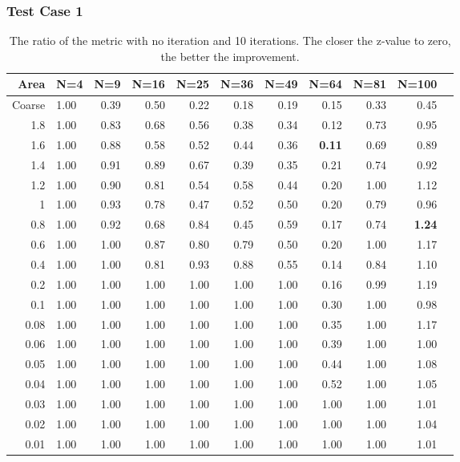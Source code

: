 \documentclass[compress]{beamer}
\begin{document}
\begin{frame}\frametitle{Test Case 1}
\begin{table}[H]
\tiny
\centering
\caption{The ratio  of the metric with no iteration and 10 iterations. The closer the z-value to zero, the better the improvement.} 
\begin{tabular}{rlrrrrrrrrr}
  \hline
 Area & N=4 & N=9 & N=16 & N=25 & N=36 & N=49 & N=64 & N=81 & N=100 \\ 
  \hline
 Coarse & 1.00 & 0.39 & 0.50 & 0.22 & 0.18 & 0.19 & 0.15 & 0.33 & 0.45 \\ 
   1.8 & 1.00 & 0.83 & 0.68 & 0.56 & 0.38 & 0.34 & 0.12 & 0.73 & 0.95 \\ 
   1.6 & 1.00 & 0.88 & 0.58 & 0.52 & 0.44 & 0.36 & \textbf{\cellcolor{blue!25}0.11} & 0.69 & 0.89 \\ 
  1.4 & 1.00 & 0.91 & 0.89 & 0.67 & 0.39 & 0.35 & 0.21 & 0.74 & 0.92 \\ 
   1.2 & 1.00 & 0.90 & 0.81 & 0.54 & 0.58 & 0.44 & 0.20 & 1.00 & 1.12 \\ 
   1 & 1.00 & 0.93 & 0.78 & 0.47 & 0.52 & 0.50 & 0.20 & 0.79 & 0.96 \\ 
0.8 & 1.00 & 0.92 & 0.68 & 0.84 & 0.45 & 0.59 & 0.17 & 0.74 & \textbf{\cellcolor{blue!25}1.24} \\ 
  0.6 & 1.00 & 1.00 & 0.87 & 0.80 & 0.79 & 0.50 & 0.20 & 1.00 & 1.17 \\ 
 0.4 & 1.00 & 1.00 & 0.81 & 0.93 & 0.88 & 0.55 & 0.14 & 0.84 & 1.10 \\ 
  0.2 & 1.00 & 1.00 & 1.00 & 1.00 & 1.00 & 1.00 & 0.16 & 0.99 & 1.19 \\ 
  0.1 & 1.00 & 1.00 & 1.00 & 1.00 & 1.00 & 1.00 & 0.30 & 1.00 & 0.98 \\ 
   0.08 & 1.00 & 1.00 & 1.00 & 1.00 & 1.00 & 1.00 & 0.35 & 1.00 & 1.17 \\ 
   0.06 & 1.00 & 1.00 & 1.00 & 1.00 & 1.00 & 1.00 & 0.39 & 1.00 & 1.00 \\ 
   0.05 & 1.00 & 1.00 & 1.00 & 1.00 & 1.00 & 1.00 & 0.44 & 1.00 & 1.08 \\ 
   0.04 & 1.00 & 1.00 & 1.00 & 1.00 & 1.00 & 1.00 & 0.52 & 1.00 & 1.05 \\ 
   0.03 & 1.00 & 1.00 & 1.00 & 1.00 & 1.00 & 1.00 & 1.00 & 1.00 & 1.01 \\ 
  0.02 & 1.00 & 1.00 & 1.00 & 1.00 & 1.00 & 1.00 & 1.00 & 1.00 & 1.04 \\ 
   0.01 & 1.00 & 1.00 & 1.00 & 1.00 & 1.00 & 1.00 & 1.00 & 1.00 & 1.01 \\ 
   \hline
\end{tabular}
\end{table}
\end{frame}
\end{document}
